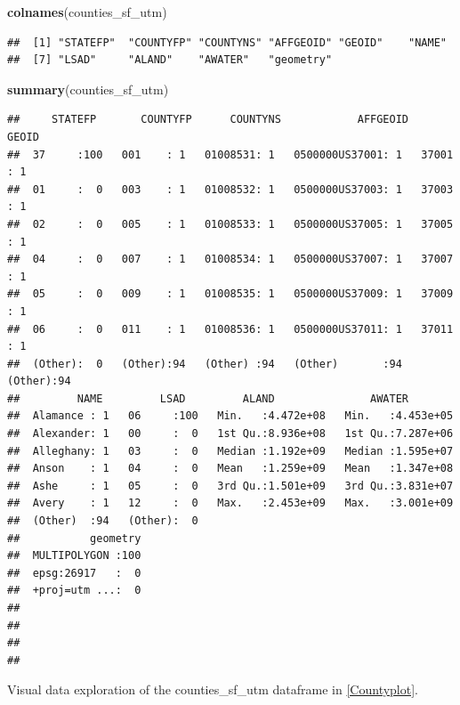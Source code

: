 \documentclass[12pt,]{article}
\newenvironment{Shaded}{\begin{snugshade}}{\end{snugshade}}
\newcommand{\KeywordTok}[1]{\textcolor[rgb]{0.13,0.29,0.53}{\textbf{#1}}}
\newcommand{\NormalTok}[1]{#1}
\begin{document}
\begin{Shaded}
\begin{Highlighting}[]
\KeywordTok{colnames}\NormalTok{(counties_sf_utm)}
\end{Highlighting}
\end{Shaded}

\begin{verbatim}
##  [1] "STATEFP"  "COUNTYFP" "COUNTYNS" "AFFGEOID" "GEOID"    "NAME"    
##  [7] "LSAD"     "ALAND"    "AWATER"   "geometry"
\end{verbatim}

\begin{Shaded}
\begin{Highlighting}[]
\KeywordTok{summary}\NormalTok{(counties_sf_utm)}
\end{Highlighting}
\end{Shaded}

\begin{verbatim}
##     STATEFP       COUNTYFP      COUNTYNS            AFFGEOID      GEOID   
##  37     :100   001    : 1   01008531: 1   0500000US37001: 1   37001  : 1  
##  01     :  0   003    : 1   01008532: 1   0500000US37003: 1   37003  : 1  
##  02     :  0   005    : 1   01008533: 1   0500000US37005: 1   37005  : 1  
##  04     :  0   007    : 1   01008534: 1   0500000US37007: 1   37007  : 1  
##  05     :  0   009    : 1   01008535: 1   0500000US37009: 1   37009  : 1  
##  06     :  0   011    : 1   01008536: 1   0500000US37011: 1   37011  : 1  
##  (Other):  0   (Other):94   (Other) :94   (Other)       :94   (Other):94  
##         NAME         LSAD         ALAND               AWATER         
##  Alamance : 1   06     :100   Min.   :4.472e+08   Min.   :4.453e+05  
##  Alexander: 1   00     :  0   1st Qu.:8.936e+08   1st Qu.:7.287e+06  
##  Alleghany: 1   03     :  0   Median :1.192e+09   Median :1.595e+07  
##  Anson    : 1   04     :  0   Mean   :1.259e+09   Mean   :1.347e+08  
##  Ashe     : 1   05     :  0   3rd Qu.:1.501e+09   3rd Qu.:3.831e+07  
##  Avery    : 1   12     :  0   Max.   :2.453e+09   Max.   :3.001e+09  
##  (Other)  :94   (Other):  0                                          
##           geometry  
##  MULTIPOLYGON :100  
##  epsg:26917   :  0  
##  +proj=utm ...:  0  
##                     
##                     
##                     
## 
\end{verbatim}

Visual data exploration of the counties\_sf\_utm dataframe in
\autoref{Countyplot}.
\end{document}
